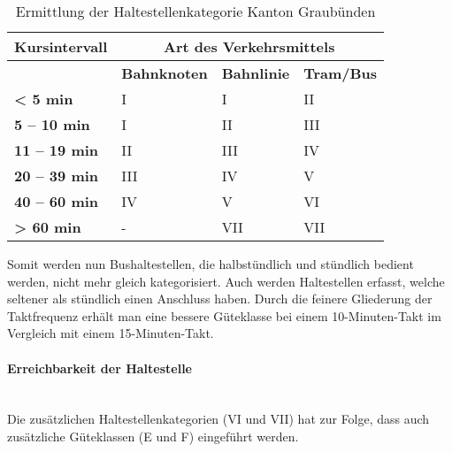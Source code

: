 \begin{table}[ht]
    \begin{tabular}[c]{l p{4.0cm} p{4.0cm} p{4.0cm}}
        \toprule
        \textbf{Kursintervall}
                                & \multicolumn{3}{c}{\textbf{Art des Verkehrsmittels}}\\
        \midrule
        \textbf{}
                                & \textbf{Bahnknoten}
                                & \textbf{Bahnlinie}
                                & \textbf{Tram/Bus}\\
        \textbf{< 5 min}
                                & I
                                & I
                                & II\\
        \cellcolor{red!25}\textbf{5 -- 10 min}
                                & I
                                & II
                                & III\\
        \cellcolor{red!25}\textbf{11 -- 19 min}
                                & II
                                & III
                                & IV\\
        \textbf{20 -- 39 min}
                                & III
                                & IV
                                & V\\
        \textbf{40 -- 60 min}
                                & IV
                                & V
                                & \cellcolor{red!25}VI\\
        \cellcolor{red!25}\textbf{> 60 min}
                                & -
                                & \cellcolor{red!25}VII
                                & \cellcolor{red!25}VII\\
        \bottomrule
    \end{tabular}
    \caption{Ermittlung der Haltestellenkategorie Kanton Graubünden}
    \label{table:Ermittlung der Haltestellenkategorie Kanton Graubünden}
\end{table}

Somit werden nun Bushaltestellen, die halbstündlich und stündlich bedient werden, nicht mehr gleich kategorisiert.
Auch werden Haltestellen erfasst, welche seltener als stündlich einen Anschluss haben.
Durch die feinere Gliederung der Taktfrequenz erhält man eine bessere Güteklasse bei einem 10-Minuten-Takt im Vergleich mit einem 15-Minuten-Takt.

\paragraph{Erreichbarkeit der Haltestelle}~\\
\label{Berechnungsmethodik Kanton Graubünden:Erreichbarkeit der Haltestelle}
Die zusätzlichen Haltestellenkategorien (VI und VII) hat zur Folge, dass auch zusätzliche Güteklassen (E und F) eingeführt werden.

